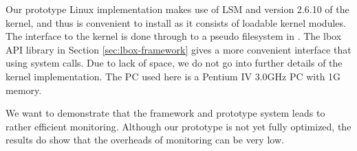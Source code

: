 Our prototype Linux implementation makes use of LSM \cite{wright2002linux} and
version 2.6.10 of the kernel,
and thus is convenient to install
as it consists of loadable kernel modules.
The interface to the kernel is done through  to a pseudo filesystem
in .
The lbox API library in Section \ref{sec:lbox-framework} 
gives a more convenient interface that using  system calls.
Due to lack of space, we do not go into further details
of the kernel implementation.
The PC used here is a Pentium IV 3.0GHz PC with 1G memory.

We want to demonstrate that the framework and prototype system leads
to rather efficient monitoring. Although our prototype is not yet
fully optimized, the results do show that the overheads of monitoring
can be very low.

